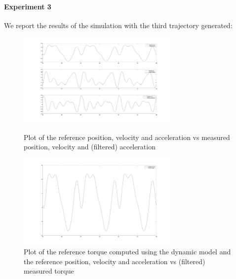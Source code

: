 \documentclass{article}
\begin{document}
\paragraph{Experiment 3}
We report the results of the simulation with the third trajectory generated:
\begin{figure}[!htbp]
\centering
\includegraphics[width=0.7\textwidth]{images/1-dof/experiment3_traj.png}
\caption{Plot of the reference position, velocity and acceleration vs measured position, velocity and (filtered) acceleration}
\includegraphics[width=0.7\textwidth]{images/1-dof/experiment3.png}
\caption{Plot of the reference torque computed using the dynamic model and the reference position, velocity and acceleration vs (filtered) measured torque}
\end{figure}
\pagebreak
\end{document}
